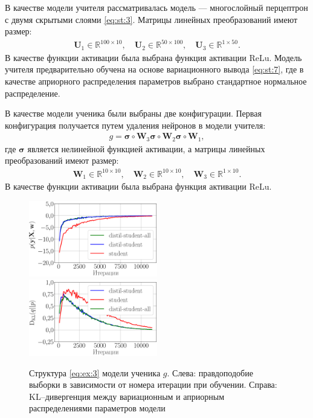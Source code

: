 В качестве модели учителя рассматривалась модель --- многослойный перцептрон с двумя скрытыми слоями \eqref{eq:st:3}. Матрицы линейных преобразований имеют размер:
\[
\label{eq:ex:2}
\begin{aligned}
\mathbf{U}_{1} \in \mathbb{R}^{100 \times 10}, \quad \mathbf{U}_{2} \in \mathbb{R}^{50 \times 100}, \quad \mathbf{U}_{3} \in \mathbb{R}^{1 \times 50}.
\end{aligned}
\]
В качестве функции активации была выбрана функция активации $\text{ReLu}$.
Модель учителя предварительно обучена на основе вариационного вывода \eqref{eq:st:7}, где в качестве априорного распределения параметров выбрано стандартное нормальное распределение.

В качестве модели ученика были выбраны две конфигурации. Первая конфигурация получается путем удаления нейронов в модели учителя:
\[
\label{eq:ex:3}
\begin{aligned}
g = \bm{\sigma} \circ \mathbf{W}_3\bm{\sigma} \circ \mathbf{W}_2\bm{\sigma} \circ \mathbf{W}_1,
\end{aligned}
\]
где $\bm{\sigma}$ является нелинейной функцией активации, а матрицы линейных преобразований имеют размер:
\[
\label{eq:ex:4}
\begin{aligned}
\mathbf{W}_{1} \in \mathbb{R}^{10 \times 10}, \quad \mathbf{W}_{2} \in \mathbb{R}^{10 \times 10},  \quad \mathbf{W}_{3} \in \mathbb{R}^{1 \times 10}.
\end{aligned}
\]
В качестве функции активации была выбрана функция активации $\text{ReLu}$.

\begin{figure}[h!]
\includegraphics[width=0.5\textwidth]{results/bayesdistil/synthetic_likelihood_3_layers.eps}
\includegraphics[width=0.5\textwidth]{results/bayesdistil/synthetic_D_KL_3_layers.eps}
\caption{Структура \eqref{eq:ex:3} модели ученика $g$. Слева: правдоподобие выборки в зависимости от номера итерации при обучении. Справа: KL--дивергенция между вариационным и априорным распределениями параметров модели}
\label{exp:fig1}
\end{figure}

